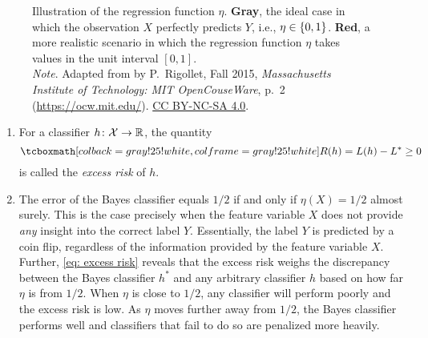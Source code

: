 \begin{figure}
    \centering
    \caption{%
        Illustration of the regression function $\eta$. \textcolor{dark-gray}{\textbf{Gray}}, the ideal case in which the observation $X$ perfectly predicts $Y$, i.e., $\eta \in \set{0, 1}$. \textcolor{dark-red}{\textbf{Red}}, a more realistic scenario in which the regression function $\eta$ takes values in the unit interval $[0, 1]$. \\
        \indent\emph{Note}. Adapted from  by P.~Rigollet, Fall 2015, \emph{Massachusetts Institute of Technology: MIT OpenCouseWare}, p.~2 (\url{https://ocw.mit.edu/}). \href{https://creativecommons.org/licenses/by-nc-sa/4.0/}{CC BY-NC-SA 4.0}.
    }
    \label{fig: regression function}
\end{figure}

\begin{remark}
    \begin{enumerate}
        \item For a classifier $h \colon \mathcal{X} \to \mathbb{R}$, the quantity
        \[
            \highlightMath{
                R(h) = L(h) - L^* \geq 0
            }
        \]
        is called the \emph{excess risk} of $h$.
        
        \item The error of the Bayes classifier equals $1/2$ if and only if $\eta(X) = 1/2$ almost surely. This is the case precisely when the feature variable $X$ does not provide \emph{any} insight into the correct label $Y$. Essentially, the label $Y$ is predicted by a coin flip, regardless of the information provided by the feature variable $X$. Further, \eqref{eq: excess risk} reveals that the excess risk weighs the discrepancy between the Bayes classifier $h^*$ and any arbitrary classifier $h$ based on how far $\eta$ is from $1/2$. When $\eta$ is close to $1/2$, any classifier will perform poorly and the excess risk is low. As $\eta$ moves further away from $1/2$, the Bayes classifier performs well and classifiers that fail to do so are penalized more heavily.
    \end{enumerate}
\end{remark}

